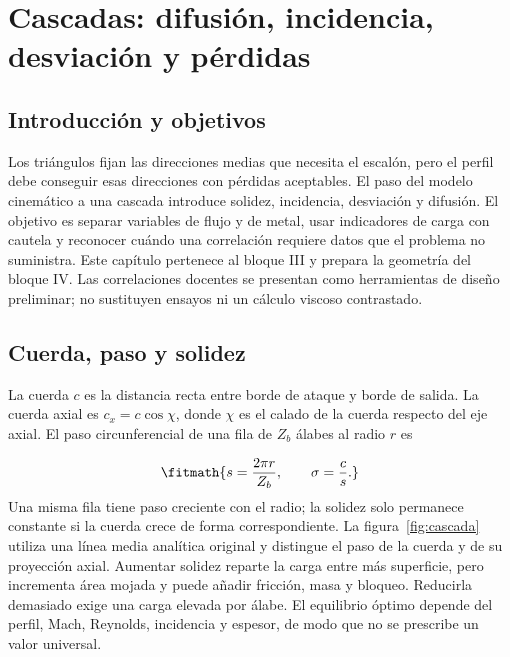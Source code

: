 \documentclass[10pt,openany]{book}
\begin{document}
\studiumchaptercheck

\chapter{Cascadas: difusión, incidencia, desviación y pérdidas}
\label{chap:c08}


\section{Introducción y objetivos}

Los triángulos fijan las direcciones medias que necesita el escalón, pero el perfil debe conseguir esas direcciones con pérdidas aceptables. El paso del modelo cinemático a una cascada introduce solidez, incidencia, desviación y difusión. El objetivo es separar variables de flujo y de metal, usar indicadores de carga con cautela y reconocer cuándo una correlación requiere datos que el problema no suministra.
Este capítulo pertenece al bloque III y prepara la geometría del bloque IV. Las correlaciones docentes se presentan como herramientas de diseño preliminar; no sustituyen ensayos ni un cálculo viscoso contrastado.

\section{Cuerda, paso y solidez}

La cuerda \(c\) es la distancia recta entre borde de ataque y borde de salida. La cuerda axial es \(c_x=c\cos\chi\), donde \(\chi\) es el calado de la cuerda respecto del eje axial. El paso circunferencial de una fila de \(Z_b\) álabes al radio \(r\) es

\[
\fitmath{s=\frac{2\pi r}{Z_b},\qquad \sigma=\frac{c}{s}.}
\]
Una misma fila tiene paso creciente con el radio; la solidez solo permanece constante si la cuerda crece de forma correspondiente. La figura~\ref{fig:cascada} utiliza una línea media analítica original y distingue el paso de la cuerda y de su proyección axial.
Aumentar solidez reparte la carga entre más superficie, pero incrementa área mojada y puede añadir fricción, masa y bloqueo. Reducirla demasiado exige una carga elevada por álabe. El equilibrio óptimo depende del perfil, Mach, Reynolds, incidencia y espesor, de modo que no se prescribe un valor universal.
\end{document}
